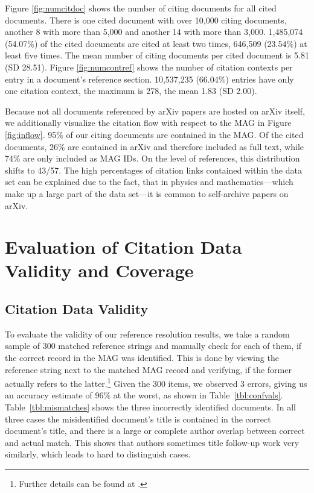 Figure \ref{fig:numcitdoc} shows the number of citing documents for all cited documents. There is one cited document with over 10,000 citing documents, another 8 with more than 5,000 and another 14 with more than 3,000. 1,485,074 (54.07\%) of the cited documents are cited at least two times, 646,509 (23.54\%) at least five times. The mean number of citing documents per cited document is 5.81 (SD 28.51). Figure \ref{fig:numcontref} shows the number of citation contexts per entry in a document's reference section. 10,537,235 (66.04\%) entries have only one citation context, the maximum is 278, the mean 1.83 (SD 2.00).

Because not all documents referenced by arXiv papers are hosted on arXiv itself, we additionally visualize the citation flow with respect to the MAG in Figure \ref{fig:inflow}. 95\% of our citing documents are contained in the MAG. Of the cited documents, 26\% are contained in arXiv and therefore included as full text, while 74\% are only included as MAG IDs. On the level of references, this distribution shifts to 43/57. The high percentages of citation links contained within the data set can be explained due to the fact, that in physics and mathematics---which make up a large part of the data set---it is common to self-archive papers on arXiv.

\section{Evaluation of Citation Data Validity and Coverage}
\label{sec:evaluation-validity-and-coverage}

\subsection{Citation Data Validity}
\label{sec:evaluation-reference-resolution}
To evaluate the validity of our reference resolution results, we take a random sample of 300 matched reference strings and manually check for each of them, if the correct record in the MAG was identified. This is done by viewing the reference string next to the matched MAG record and verifying, if the former actually refers to the latter.\footnote{Further details can be found at .} Given the 300 items, we observed 3 errors, giving us an accuracy estimate of 96\% at the worst, as shown in Table~\ref{tbl:confvals}. Table~\ref{tbl:mismatches} shows the three incorrectly identified documents. In all three cases the misidentified document's title is contained in the correct document's title, and there is a large or complete author overlap between correct and actual match. This shows that authors sometimes title follow-up work very similarly, which leads to hard to distinguish cases.

